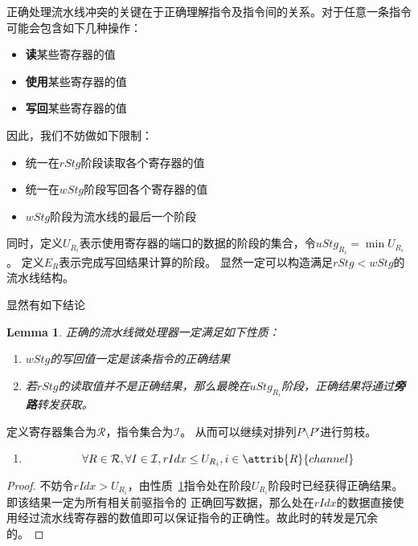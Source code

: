 \documentclass[hyperref,UTF8]{ctexart}
\newtheorem{lem}[thm]{Lemma}
\theoremstyle{definition}
\theoremstyle{remark}
\numberwithin{equation}{subsection}
\newcommand{\Emph}{\textbf}
\begin{document}
	正确处理流水线冲突的关键在于正确理解指令及指令间的关系。对于任意一条指令可能会包含如下几种操作：
	\begin{itemize}
		\item \Emph{读}某些寄存器的值
		\item \Emph{使用}某些寄存器的值
		\item \Emph{写回}某些寄存器的值
	\end{itemize}
	因此，我们不妨做如下限制：
	\begin{itemize}
		\item 统一在$rStg$阶段读取各个寄存器的值
		\item 统一在$wStg$阶段写回各个寄存器的值
		\item $wStg$阶段为流水线的最后一个阶段
	\end{itemize}
	同时，定义$U_{R_i}$表示使用寄存器的端口的数据的阶段的集合，令$uStg_{R_i} = \min U_{R_i}$。
	定义$E_{R}$表示完成写回结果计算的阶段。
	显然一定可以构造满足$rStg < wStg$的流水线结构。
	
	显然有如下结论
	\begin{lem}
	\label{lem:insn_operator}
	正确的流水线微处理器一定满足如下性质：
	\begin{enumerate}[(1)]
	
		\item $wStg$的写回值一定是该条指令的正确结果
		
		\item 若$rStg$的读取值并不是正确结果，那么最晚在$uStg_{R_i}$阶段，正确结果将通过\Emph{旁路}转发获取。
		
	\end{enumerate}
	\end{lem}
	
	定义寄存器集合为$\mathcal{R}$，指令集合为$\mathcal{I}$。
	从而可以继续对排列$P \setminus P'$进行剪枝。
	\begin{enumerate}[(1)]
		
		\item
		\begin{equation}
			\forall R \in \mathcal{R}, \forall I \in \mathcal{I}, rIdx \le U_{R_i}, i \in \attrib{R}{channel}	\label{equ:cover_insn_ustg}
		\end{equation}
		
	\end{enumerate}
	
	\begin{proof}
	不妨令$rIdx > U_{R_i}$，由性质~\ref{lem:insn_operator}指令处在阶段$U_{R_i}$阶段时已经获得正确结果。即该结果一定为所有相关前驱指令的
	正确回写数据，那么处在$rIdx$的数据直接使用经过流水线寄存器的数值即可以保证指令的正确性。故此时的转发是冗余的。
	\end{proof}
	
\end{document}
